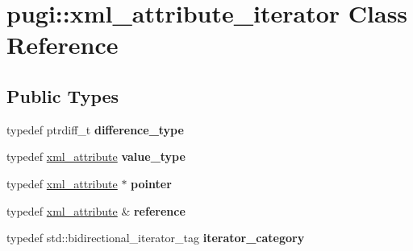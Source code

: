 \hypertarget{classpugi_1_1xml__attribute__iterator}{}\section{pugi\+:\+:xml\+\_\+attribute\+\_\+iterator Class Reference}
\label{classpugi_1_1xml__attribute__iterator}
\subsection*{Public Types}
\begin{DoxyCompactItemize}
\item 
\hypertarget{classpugi_1_1xml__attribute__iterator_a00b3eecf2aba886a673ad2319be88618}{}typedef ptrdiff\+\_\+t {\bfseries difference\+\_\+type}\label{classpugi_1_1xml__attribute__iterator_a00b3eecf2aba886a673ad2319be88618}

\item 
\hypertarget{classpugi_1_1xml__attribute__iterator_a2b0e779f12de813d7a806056ebed8907}{}typedef \hyperlink{classpugi_1_1xml__attribute}{xml\+\_\+attribute} {\bfseries value\+\_\+type}\label{classpugi_1_1xml__attribute__iterator_a2b0e779f12de813d7a806056ebed8907}

\item 
\hypertarget{classpugi_1_1xml__attribute__iterator_a6ed6fb3197abb02ffa848ad6b9b7a1be}{}typedef \hyperlink{classpugi_1_1xml__attribute}{xml\+\_\+attribute} $\ast$ {\bfseries pointer}\label{classpugi_1_1xml__attribute__iterator_a6ed6fb3197abb02ffa848ad6b9b7a1be}

\item 
\hypertarget{classpugi_1_1xml__attribute__iterator_ade97045a1217d0a7897e5f5873297117}{}typedef \hyperlink{classpugi_1_1xml__attribute}{xml\+\_\+attribute} \& {\bfseries reference}\label{classpugi_1_1xml__attribute__iterator_ade97045a1217d0a7897e5f5873297117}

\item 
\hypertarget{classpugi_1_1xml__attribute__iterator_aad988273a3e4cdc5fa3eb879dbdc8d35}{}typedef std\+::bidirectional\+\_\+iterator\+\_\+tag {\bfseries iterator\+\_\+category}\label{classpugi_1_1xml__attribute__iterator_aad988273a3e4cdc5fa3eb879dbdc8d35}

\end{DoxyCompactItemize}
